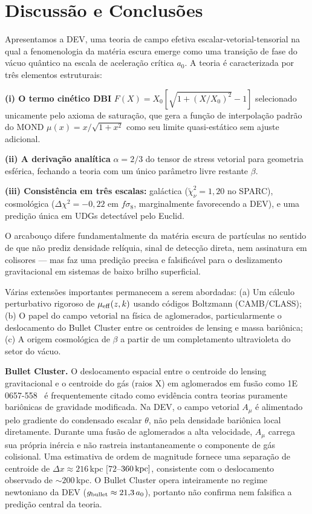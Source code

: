 \documentclass[aps,prd,twocolumn,showpacs,superscriptaddress]{revtex4-2}
\newcommand{\aO}{a_0}
\newcommand{\Xzero}{X_0}
\newcommand{\mueff}{\mu_{\rm eff}}
\begin{document}
\section{Discussão e Conclusões}
\label{sec:conclusion}

Apresentamos a DEV, uma teoria de campo efetiva
escalar-vetorial-tensorial na qual a fenomenologia da matéria
escura emerge como uma transição de fase do vácuo quântico na
escala de aceleração crítica $\aO$.
A teoria é caracterizada por três elementos estruturais:

\textbf{(i) O termo cinético DBI} $F(X) = \Xzero[\sqrt{1+(X/\Xzero)^2}-1]$
selecionado unicamente pelo axioma de saturação, que gera a
função de interpolação padrão do MOND $\mu(x) = x/\sqrt{1+x^2}$
como seu limite quasi-estático sem ajuste adicional.

\textbf{(ii) A derivação analítica} $\alpha = 2/3$ do tensor de
stress vetorial para geometria esférica, fechando a teoria com
um único parâmetro livre restante $\beta$.

\textbf{(iii) Consistência em três escalas:}
galáctica ($\widetilde\chi^2_\nu = 1{,}20$ no SPARC),
cosmológica ($\Delta\chi^2 = -0{,}22$ em $f\sigma_8$,
marginalmente favorecendo a DEV), e uma predição única em
UDGs detectável pelo Euclid.

O arcabouço difere fundamentalmente da matéria escura de
partículas no sentido de que não prediz densidade relíquia,
sinal de detecção direta, nem assinatura em colisores — mas
faz uma predição precisa e falsificável para o deslizamento
gravitacional em sistemas de baixo brilho superficial.

Várias extensões importantes permanecem a serem abordadas:
(a) Um cálculo perturbativo rigoroso de $\mueff(z,k)$ usando
    códigos Boltzmann (CAMB/CLASS);
(b) O papel do campo vetorial na física de aglomerados,
    particularmente o deslocamento do Bullet Cluster entre
    os centroides de lensing e massa bariônica;
(c) A origem cosmológica de $\beta$ a partir de um completamento
    ultravioleta do setor do vácuo.

\textbf{Bullet Cluster.}
O deslocamento espacial entre o centroide do lensing gravitacional
e o centroide do gás (raios X) em aglomerados em fusão como
1E\,0657-558~\cite{Clowe2006} é frequentemente citado como
evidência contra teorias puramente bariônicas de gravidade
modificada.
Na DEV, o campo vetorial $A_\mu$ é alimentado pelo gradiente do
condensado escalar $\theta$, não pela densidade bariônica local
diretamente.
Durante uma fusão de aglomerados a alta velocidade, $A_\mu$
carrega sua própria inércia e não rastreia instantaneamente o
componente de gás colisional.
Uma estimativa de ordem de magnitude fornece uma separação
de centroide de $\Delta x \approx 216$\,kpc
$[72$--$360\,{\rm kpc}]$, consistente com o deslocamento
observado de ${\sim}200$\,kpc.
O Bullet Cluster opera inteiramente no regime newtoniano da DEV
($g_{\rm bullet} \approx 21{,}3\,\aO$), portanto não confirma
nem falsifica a predição central da teoria.
\end{document}
